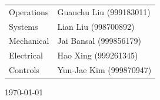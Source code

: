 \begin{titlepage}
\begin{centering} \large
\begin{tabular}{ll}
Operations	&	Guanchu Liu (999183011)	\\
Systems	&	Lian Liu (998700892)		\\
Mechanical	&	Jai Bansal (999856179)	\\
Electrical	& 	Hao Xing (999261345)	\\
Controls	&	Yun-Jae Kim (999870947)	\\[1cm]
\end{tabular}
\end{centering}




{\large \today}\\[3cm] %
 

\vfill %

\end{titlepage}
